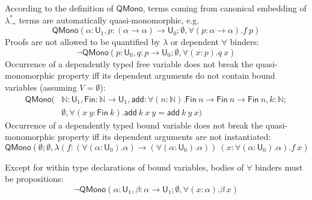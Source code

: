 \noindent According to the definition of $\mathsf{QMono}$, terms coming from canonical embedding of $\lambda_\to^*$
terms are automatically quasi-monomorphic, e.g.
$$\mathsf{QMono}(\alpha : \mathsf{U}_1, p : (\alpha \to \alpha) \to \mathsf{U}_0; \emptyset, \forall (p : \alpha \to \alpha). f \ p)$$
Proofs are not allowed to be quantified by $\lambda$ or dependent $\forall$ binders:
$$\neg \mathsf{QMono}(p : \mathsf{U}_0, q : p \to \mathsf{U}_0; \emptyset, \forall (x : p). q \ x)$$
Occurrence of a dependently typed free variable does not break the quasi-monomorphic property iff
its dependent arguments do not contain bound variables (assuming $V = \emptyset$):
\begin{align*}
  \mathsf{QMono}(
  & \mathbb{N} : \mathsf{U}_1, \mathsf{Fin} : \mathbb{N} \to \mathsf{U}_1,
    \mathsf{add} : \forall (n : \mathbb{N}). \mathsf{Fin} \ n \to \mathsf{Fin} \ n \to \mathsf{Fin} \ n, k : \mathbb{N}; \\
  & \emptyset, \forall (x \ y : \mathsf{Fin} \ k). \mathsf{add} \ k \ x \ y = \mathsf{add} \ k \ y \ x)
\end{align*}
Occurrence of a dependently typed bound variable does not break the quasi-monomorphic property iff
its dependent arguments are not instantiated:
$$\mathsf{QMono}(\emptyset; \emptyset, \lambda (f : (\forall (\alpha : \mathsf{U}_0). \alpha) \to (\forall (\alpha : \mathsf{U}_0). \alpha)) \
  (x : \forall (\alpha : \mathsf{U}_0). \alpha). f \ x)$$
  
\noindent Except for within type declarations of bound variables, bodies of $\forall$ binders must be propositions:
$$\neg \mathsf{QMono}(\alpha : \mathsf{U}_1, \beta : \alpha \to \mathsf{U}_1; \emptyset, \forall (x : \alpha). \beta \ x)$$

